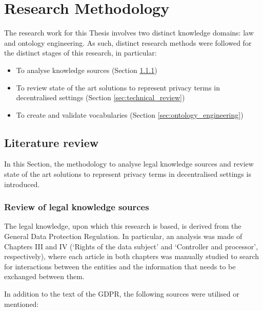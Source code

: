 \section{Research Methodology}
\label{sec:methodology}

The research work for this Thesis involves two distinct knowledge domains: law and ontology engineering. As such, distinct research methods were followed for the distinct stages of this research, in particular:

\begin{itemize}
    \item To analyse knowledge sources (Section \ref{sec:law_review})
    \item To review state of the art solutions to represent privacy terms in decentralised settings (Section \ref{sec:technical_review})
    \item To create and validate vocabularies (Section \ref{sec:ontology_engineering})
\end{itemize}

\subsection{Literature review}
\label{sec:literature_review}

In this Section, the methodology to analyse legal knowledge sources and review state of the art solutions to represent privacy terms in decentralised settings is introduced.

\subsubsection{Review of legal knowledge sources}
\label{sec:law_review}

The legal knowledge, upon which this research is based, is derived from the General Data Protection Regulation.
In particular, an analysis was made of Chapters III and IV (`Rights of the data subject' and `Controller and processor', respectively), where each article in both chapters was manually studied to search for interactions between the entities and the information that needs to be exchanged between them.

In addition to the text of the GDPR, the following sources were utilised or mentioned:

